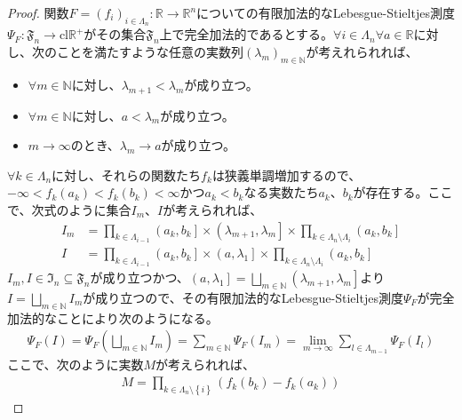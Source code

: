 \documentclass[dvipdfmx]{jsarticle}
\begin{document}
\begin{proof}
関数$F = \left( f_{i} \right)_{i \in \varLambda_{n}}:\mathbb{R} \rightarrow \mathbb{R}^{n}$についての有限加法的なLebesgue-Stieltjes測度$\varPsi_{F}:\mathfrak{F}_{n} \rightarrow \mathrm{cl}\mathbb{R}^{+}$がその集合$\mathfrak{F}_{n}$上で完全加法的であるとする。$\forall i \in \varLambda_{n}\forall a \in \mathbb{R}$に対し、次のことを満たすような任意の実数列$\left( \lambda_{m} \right)_{m \in \mathbb{N}}$が考えれられれば、
\begin{itemize}
\item
  $\forall m \in \mathbb{N}$に対し、$\lambda_{m + 1} < \lambda_{m}$が成り立つ。
\item
  $\forall m \in \mathbb{N}$に対し、$a < \lambda_{m}$が成り立つ。
\item
  $m \rightarrow \infty$のとき、$\lambda_{m} \rightarrow a$が成り立つ。
\end{itemize}
$\forall k \in \varLambda_{n}$に対し、それらの関数たち$f_{k}$は狭義単調増加するので、$- \infty < f_{k}\left( a_{k} \right) < f_{k}\left( b_{k} \right) < \infty$かつ$a_{k} < b_{k}$なる実数たち$a_{k}$、$b_{k}$が存在する。ここで、次式のように集合$I_{m}$、$I$が考えられれば、
\begin{align*}
I_{m} &= \prod_{k \in \varLambda_{i - 1}} \left( a_{k},b_{k} \right] \times \left( \lambda_{m + 1},\lambda_{m} \right] \times \prod_{k \in \varLambda_{n} \setminus \varLambda_{i}} \left( a_{k},b_{k} \right]\\
I &= \prod_{k \in \varLambda_{i - 1}} \left( a_{k},b_{k} \right] \times \left( a,\lambda_{1} \right] \times \prod_{k \in \varLambda_{n} \setminus \varLambda_{i}} \left( a_{k},b_{k} \right]
\end{align*}
$I_{m},I \in \mathfrak{I}_{n} \subseteq \mathfrak{F}_{n}$が成り立つかつ、$\left( a,\lambda_{1} \right] = \bigsqcup_{m \in \mathbb{N}} \left( \lambda_{m + 1},\lambda_{m} \right]$より$I = \bigsqcup_{m \in \mathbb{N}} I_{m}$が成り立つので、その有限加法的なLebesgue-Stieltjes測度$\varPsi_{F}$が完全加法的なことにより次のようになる。
\begin{align*}
\varPsi_{F}(I) = \varPsi_{F}\left( \bigsqcup_{m \in \mathbb{N}} I_{m} \right) = \sum_{m \in \mathbb{N}} {\varPsi_{F}\left( I_{m} \right)} = \lim_{m \rightarrow \infty}{\sum_{l \in \varLambda_{m - 1}} {\varPsi_{F}\left( I_{l} \right)}}
\end{align*}
ここで、次のように実数$M$が考えられれば、
\begin{align*}
M = \prod_{k \in \varLambda_{n} \setminus \left\{ i \right\}} \left( f_{k}\left( b_{k} \right) - f_{k}\left( a_{k} \right) \right)

\end{align*}
\end{proof}
\end{document}

